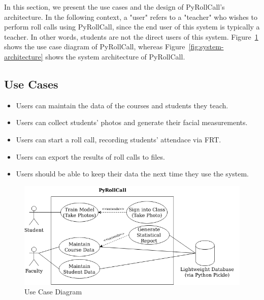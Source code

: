 In this section, we present the use cases and the design of PyRollCall's architecture.
In the following context, a "user" refers to a "teacher" who wishes to perform roll calls
using PyRollCall, since the end user of this system is typically a teacher. In other words,
students are not the direct users of this system.
Figure~\ref{fig:use-case-diagram} shows the use case diagram of PyRollCall, whereas
Figure~\ref{fig:system-architecture} shows the system architecture of PyRollCall.


\subsection{Use Cases}
\vspace{0.3cm}

\begin{itemize}
  \item Users can maintain the data of the courses and students they teach.
  \item Users can collect students' photos and generate their facial measurements.
  \item Users can start a roll call, recording students' attendace via FRT.
  \item Users can export the results of roll calls to files.
  \item Users should be able to keep their data the next time they use the system.
  \end{itemize}
\setstretch{\myContentLineSpacing}

\begin{figure}[!htb]
  \centering
  \includegraphics[width=\linewidth]{figures/use-case-diagram.png}
  \caption{Use Case Diagram}
  \label{fig:use-case-diagram}
\end{figure}

